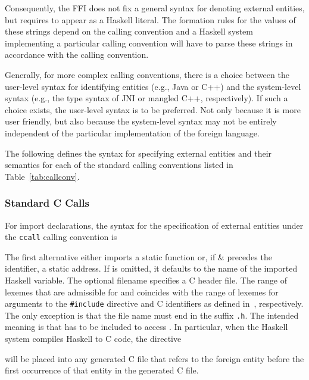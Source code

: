 \documentclass[a4paper,twosides]{article}
\newcommand{\code}[1]{\texttt{#1}}      %
\begin{document}
Consequently, the FFI does not fix a general syntax for denoting external
entities, but requires  to appear as a Haskell 
literal.  The formation rules for the values of these strings depend on the
calling convention and a Haskell system implementing a particular calling
convention will have to parse these strings in accordance with the calling
convention.

Generally, for more complex calling conventions, there is a choice between the
user-level syntax for identifying entities (e.g., Java or C{+}{+}) and the
system-level syntax (e.g., the type syntax of JNI or mangled C{+}{+},
respectively).  If such a choice exists, the user-level syntax is to be
preferred.  Not only because it is more user friendly, but also because the
system-level syntax may not be entirely independent of the particular
implementation of the foreign language.

The following defines the syntax for specifying external entities and their
semantics for each of the standard calling conventions listed in
Table~\ref{tab:callconv}.

\subsubsection{Standard C Calls}
\label{sec:ccall}

For import declarations, the syntax for the specification of external entities
under the \code{ccall} calling convention is
%
\begin{grammar}
  \grule{fname}{%
    \gverbal{file name with suffix `\code{.h}'}}
\end{grammar}
%
The first alternative either imports a static function  or, if
\gterm\& precedes the identifier, a static address.  If  is
omitted, it defaults to the name of the imported Haskell variable.  The
optional filename  specifies a C header file.  The range of
lexemes that are admissible for  and  coincides with
the range of lexemes for arguments to the \code{\#{}include} directive and C
identifiers as defined in~\cite{C}, respectively.  The only exception is that
the file name  must end in the suffix \code{.h}.  The intended
meaning is that  has to be included to access .  In
particular, when the Haskell system compiles Haskell to C code, the directive
%
\begin{quote}
\end{quote}
%
will be placed into any generated C file that refers to the foreign entity
before the first occurrence of that entity in the generated C file.
\end{document}

